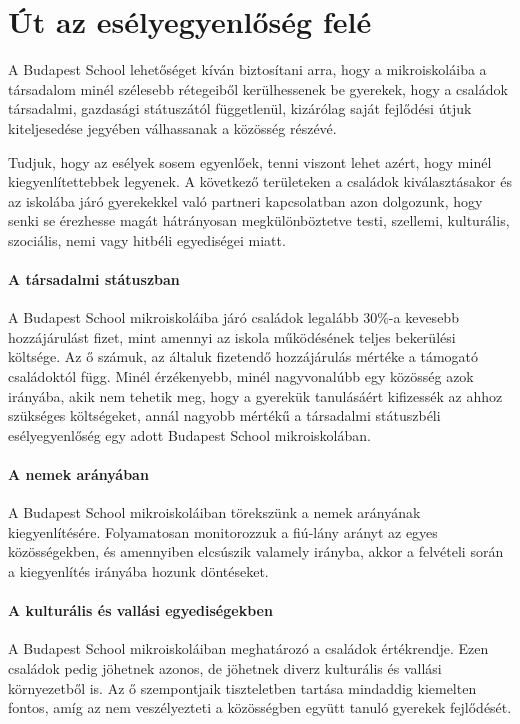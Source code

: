 \section{Út az esélyegyenlőség felé}
\label{sec:ut_az_eselyegyenloseg_fele}
A Budapest School lehetőséget kíván biztosítani arra, hogy a
mikroiskoláiba a társadalom minél szélesebb rétegeiből kerülhessenek be
gyerekek, hogy a családok társadalmi, gazdasági státuszától
függetlenül, kizárólag saját fejlődési útjuk kiteljesedése jegyében
válhassanak a közösség részévé.

Tudjuk, hogy az esélyek sosem egyenlőek, tenni viszont lehet azért, hogy
minél kiegyenlítettebbek legyenek. A következő területeken a családok
kiválasztásakor és az iskolába járó gyerekekkel való partneri
kapcsolatban azon dolgozunk, hogy senki se érezhesse magát hátrányosan
megkülönböztetve testi, szellemi, kulturális, szociális, nemi vagy
hitbéli egyediségei miatt.

\paragraph{A társadalmi státuszban}

  A Budapest School mikroiskoláiba járó családok legalább 30\%-a
  kevesebb hozzájárulást fizet, mint amennyi az iskola működésének
  teljes bekerülési költsége. Az ő számuk, az általuk fizetendő
  hozzájárulás mértéke a támogató családoktól függ. Minél érzékenyebb,
  minél nagyvonalúbb egy közösség azok irányába, akik nem tehetik meg,
  hogy a gyerekük tanulásáért kifizessék az ahhoz szükséges költségeket,
  annál nagyobb mértékű a társadalmi státuszbéli esélyegyenlőség egy
  adott Budapest School mikroiskolában.


\paragraph{A nemek arányában}


  A Budapest School mikroiskoláiban törekszünk a nemek arányának
  kiegyenlítésére. Folyamatosan monitorozzuk a fiú-lány arányt az egyes
  közösségekben, és amennyiben elcsúszik valamely irányba, akkor a
  felvételi során a kiegyenlítés irányába hozunk döntéseket.


\paragraph{A kulturális és vallási egyediségekben}


  A Budapest School mikroiskoláiban meghatározó a családok értékrendje. Ezen
  családok pedig jöhetnek azonos, de jöhetnek diverz kulturális és
  vallási környezetből is. Az ő szempontjaik tiszteletben tartása
  mindaddig kiemelten fontos, amíg az nem veszélyezteti a közösségben
  együtt tanuló gyerekek fejlődését.


